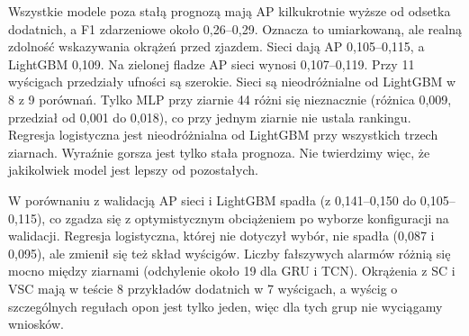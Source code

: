Wszystkie modele poza stałą prognozą mają AP kilkukrotnie wyższe od
odsetka dodatnich, a F1 zdarzeniowe około 0,26--0,29. Oznacza to
umiarkowaną, ale realną zdolność wskazywania okrążeń przed zjazdem.
Sieci dają AP 0,105--0,115, a LightGBM 0,109. Na zielonej fladze AP sieci
wynosi 0,107--0,119. Przy 11 wyścigach przedziały ufności są szerokie.
Sieci są nieodróżnialne od LightGBM w 8 z 9 porównań. Tylko MLP przy
ziarnie 44 różni się nieznacznie (różnica 0,009, przedział od 0,001 do
0,018), co przy jednym ziarnie nie ustala rankingu. Regresja logistyczna
jest nieodróżnialna od LightGBM przy wszystkich trzech ziarnach.
Wyraźnie gorsza jest tylko stała prognoza. Nie twierdzimy więc, że jakikolwiek
model jest lepszy od pozostałych.

W porównaniu z walidacją AP sieci i LightGBM spadła (z 0,141--0,150 do
0,105--0,115), co zgadza się z optymistycznym obciążeniem po wyborze
konfiguracji na walidacji. Regresja logistyczna, której nie dotyczył
wybór, nie spadła (0,087 i 0,095), ale zmienił się też skład wyścigów.
Liczby fałszywych alarmów różnią się mocno między ziarnami (odchylenie
około 19 dla GRU i TCN). Okrążenia z SC i VSC mają w teście 8 przykładów
dodatnich w 7 wyścigach, a wyścig o szczególnych regułach opon jest tylko
jeden, więc dla tych grup nie wyciągamy wniosków.
